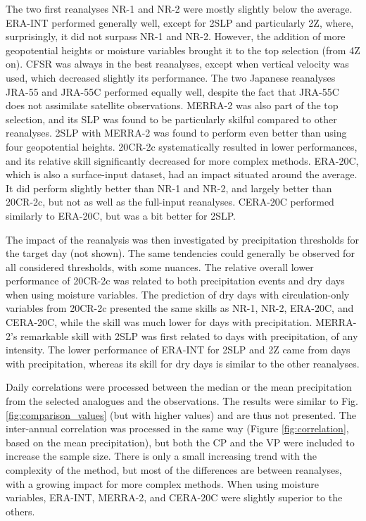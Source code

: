 \documentclass{ametsoc}
\begin{document}
The two first reanalyses NR-1 and NR-2 were mostly slightly below the average. ERA-INT performed generally well, except for 2SLP and particularly 2Z, where, surprisingly, it did not surpass NR-1 and NR-2. However, the addition of more geopotential heights or moisture variables brought it to the top selection (from 4Z on). CFSR was always in the best reanalyses, except when vertical velocity was used, which decreased slightly its performance. The two Japanese reanalyses JRA-55 and JRA-55C performed equally well, despite the fact that JRA-55C does not assimilate satellite observations. MERRA-2 was also part of the top selection, and its SLP was found to be particularly skilful compared to other reanalyses. 2SLP with MERRA-2 was found to perform even better than using four geopotential heights. 20CR-2c systematically resulted in lower performances, and its relative skill significantly decreased for more complex methods. ERA-20C, which is also a surface-input dataset, had an impact situated around the average. It did perform slightly better than NR-1 and NR-2, and largely better than 20CR-2c, but not as well as the full-input reanalyses. CERA-20C performed similarly to ERA-20C, but was a bit better for 2SLP.

The impact of the reanalysis was then investigated by precipitation thresholds for the target day (not shown). The same tendencies could generally be observed for all considered thresholds, with some nuances. The relative overall lower performance of 20CR-2c was related to both precipitation events and dry days when using moisture variables. The prediction of dry days with circulation-only variables from 20CR-2c presented the same skills as NR-1, NR-2, ERA-20C, and CERA-20C, while the skill was much lower for days with precipitation. MERRA-2's remarkable skill with 2SLP was first related to days with precipitation, of any intensity. The lower performance of ERA-INT for 2SLP and 2Z came from days with precipitation, whereas its skill for dry days is similar to the other reanalyses.

Daily correlations were processed between the median or the mean precipitation from the selected analogues and the observations. The results were similar to Fig. \ref{fig:comparison_values} (but with higher values) and are thus not presented. The inter-annual correlation was processed in the same way (Figure \ref{fig:correlation}, based on the mean precipitation), but both the CP and the VP were included to increase the sample size. There is only a small increasing trend with the complexity of the method, but most of the differences are between reanalyses, with a growing impact for more complex methods. When using moisture variables, ERA-INT, MERRA-2, and CERA-20C were slightly superior to the others.
\end{document}
